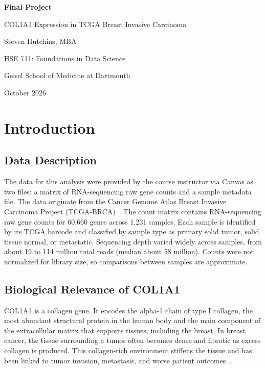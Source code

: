\documentclass{article}
\begin{document}
\begin{titlepage}

\centering
\vspace*{2in}
{\Huge\bfseries Final Project\par}
\vspace{0.5cm}
{\large COL1A1 Expression in TCGA Breast Invasive Carcinoma\par}
\vspace{2cm}
{\large Steven Hutchins, MBA\par}
\vspace{0.3cm}
{\large HSE 711: Foundations in Data Science\par}
{\large Geisel School of Medicine at Dartmouth\par}
\vspace{0.3cm}
{\large October 2026\par}
\end{titlepage}

\tableofcontents
\newpage

\section{Introduction}

\subsection{Data Description}
The data for this analysis were provided by the course instructor via Canvas as two files: a matrix of RNA-sequencing raw gene counts and a sample metadata file. The data originate from the Cancer Genome Atlas Breast Invasive Carcinoma Project (TCGA-BRCA)~\cite{TCGA2012BRCA, Grossman2016GDC}. The count matrix contains RNA-sequencing raw gene counts for 60,660 genes across 1,231 samples. Each sample is identified by its TCGA barcode and classified by sample type as primary solid tumor, solid tissue normal, or metastatic. Sequencing depth varied widely across samples, from about 19 to 114 million total reads (median about 58 million). Counts were not normalized for library size, so comparisons between samples are approximate.

\subsection{Biological Relevance of COL1A1}
COL1A1 is a collagen gene. It encodes the alpha-1 chain of type I collagen, the most abundant structural protein in the human body and the main component of the extracellular matrix that supports tissues, including the breast. In breast cancer, the tissue surrounding a tumor often becomes dense and fibrotic as excess collagen is produced. This collagen-rich environment stiffens the tissue and has been linked to tumor invasion, metastasis, and worse patient outcomes~\cite{Liu2018COL1A1, Provenzano2008, Levental2009, Conklin2011}.
\end{document}
